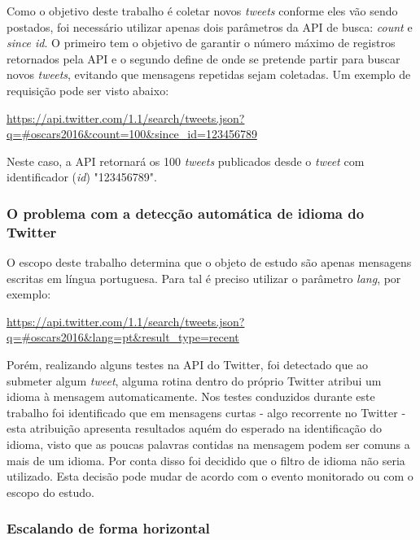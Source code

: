 Como o objetivo deste trabalho é coletar novos \textit{tweets} conforme eles vão sendo postados, foi necessário utilizar apenas dois parâmetros da API de busca: \textit{count} e \textit{since id}. O primeiro tem o objetivo de garantir o número máximo de registros retornados pela API e o segundo define de onde se pretende partir para buscar novos \textit{tweets}, evitando que mensagens repetidas sejam coletadas. Um exemplo de requisição pode ser visto abaixo:

\url{https://api.twitter.com/1.1/search/tweets.json?q=#oscars2016&count=100&since_id=123456789}

Neste caso, a API retornará os 100 \textit{tweets} publicados desde o \textit{tweet} com identificador (\textit{id}) "123456789".

\subsubsection{O problema com a detecção automática de idioma do Twitter}

O escopo deste trabalho determina que o objeto de estudo são apenas mensagens escritas em língua portuguesa. Para tal é preciso utilizar o parâmetro \textit{lang}, por exemplo:

\url{https://api.twitter.com/1.1/search/tweets.json?q=#oscars2016&lang=pt&result_type=recent}

Porém, realizando alguns testes na API do Twitter, foi detectado que ao submeter algum \textit{tweet}, alguma rotina dentro do próprio Twitter atribui um idioma à mensagem automaticamente. Nos testes conduzidos durante este trabalho foi identificado que em mensagens curtas - algo recorrente no Twitter - esta atribuição apresenta resultados aquém do esperado na identificação do idioma, visto que as poucas palavras contidas na mensagem podem ser comuns a mais de um idioma. Por conta disso foi decidido que o filtro de idioma não seria utilizado. Esta decisão pode mudar de acordo com o evento monitorado ou com o escopo do estudo.

\subsubsection{Escalando de forma horizontal}

